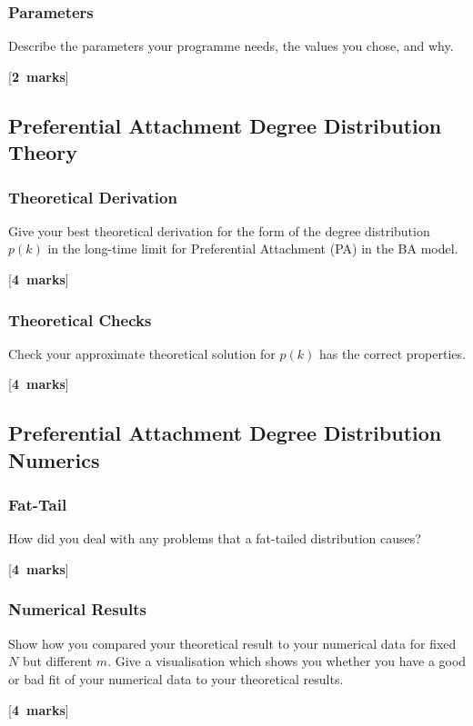\documentclass[a4paper,12pt]{article}
\newcounter{nmarks}
\newcommand{\qmarks}[1]{\addtocounter{nmarks}{#1} }
\renewcommand{\qmarks}[1]{\addtocounter{nmarks}{#1} \hspace*{\fill} [\textbf{#1~marks}]}
\begin{document}
\subsubsection{Parameters}
Describe the parameters your programme needs, the values you chose, and why. \qmarks{2}



\subsection{Preferential Attachment Degree Distribution Theory}

\subsubsection{Theoretical Derivation}
Give your best theoretical derivation for the form of the degree distribution $p(k)$ in the long-time limit for Preferential Attachment (PA) in the BA model. \qmarks{4}

\subsubsection{Theoretical Checks}
Check your approximate theoretical solution for $p(k)$ has the correct properties. \qmarks{4}




\subsection{Preferential Attachment Degree Distribution Numerics}

\subsubsection{Fat-Tail}
How did you deal with any problems that a fat-tailed distribution causes? \qmarks{4}

\subsubsection{Numerical Results}
Show how you compared your theoretical result to your numerical data for fixed $N$ but different $m$.
Give a visualisation which shows you whether you have a good or bad fit of your numerical data to your theoretical results.
\qmarks{4}
\end{document}
